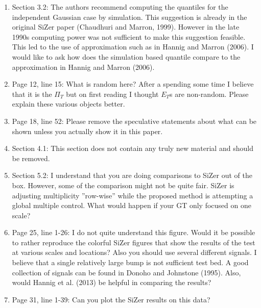 \documentclass[a4paper,12pt]{article}
\begin{document}
\vspace{0.25cm}

\begin{enumerate}
\item Section 3.2: The authors recommend computing the quantiles for the
independent Gaussian case by simulation. This suggestion is already in
the original SiZer paper (Chaudhuri and Marron, 1999). However in the
late 1990s computing power was not sufficient to make this suggestion
feasible. This led to the use of approximation such as in Hannig and
Marron (2006). I would like to ask how does the simulation based
quantile compare to the approximation in Hannig and Marron (2006).
\item Page 12, line 15: What is random here? After a spending some time I believe that it is the $\Pi_T$ but on first reading I thought $E_T$s are non-random. Please explain these various objects better.
\item Page 18, line 52: Please remove the speculative statements about
what can be shown unless you actually show it in this paper.
\item Section 4.1: This section does not contain any truly new material and
should be removed.
\item Section 5.2: I understand that you are doing comparisons to SiZer out
of the box. However, some of the comparison might not be quite fair.
SiZer is adjusting multiplicity ”row-wise” while the proposed method
is attempting a global multiple control. What would happen if your
GT only focused on one scale?
\item Page 25, line 1-26: I do not quite understand this figure. Would it
be possible to rather reproduce the colorful SiZer figures that show the
results of the test at various scales and locations? Also you should use
several different signals. I believe that a single relatively large bump
is not sufficient test bed. A good collection of signals can be found in Donoho and Johnstone (1995). Also, would Hannig et al. (2013) be
helpful in comparing the results?
\item Page 31, line 1-39: Can you plot the SiZer results on this data?
\end{enumerate}
\end{document}
